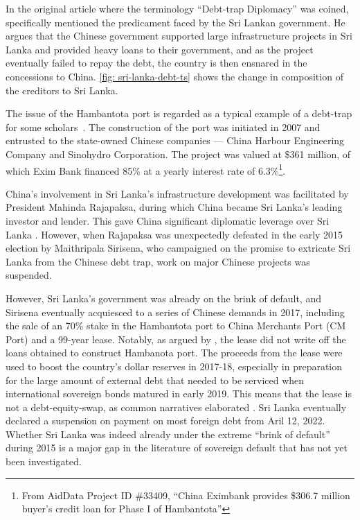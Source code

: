In the original article where the terminology ``Debt-trap Diplomacy'' was coined, \citet{Chellaney_2017} specifically mentioned the predicament faced by the Sri Lankan government. He argues that the Chinese government supported large infrastructure projects in Sri Lanka and provided heavy loans to their government, and as the project eventually failed to repay the debt, the country is then ensnared in the concessions to China. \autoref{fig: sri-lanka-debt-ts} shows the change in composition of the creditors to Sri Lanka.

The issue of the Hambantota port is regarded as a typical example of a debt-trap for some scholars~\citep*{Moramudali_2020}.
The construction of the port was initiated in 2007 and entrusted to the state-owned Chinese companies --- China Harbour Engineering Company and Sinohydro Corporation. The project was valued at \$361 million, of which Exim Bank financed 85\% at a yearly interest rate of 6.3\%\footnote{From AidData Project ID \#33409, ``China Eximbank provides \$306.7 million buyer's credit loan for Phase I of Hambantota''}.


China's involvement in Sri Lanka's infrastructure development was facilitated by President Mahinda Rajapaksa, during which China became Sri Lanka's leading investor and lender. This gave China significant diplomatic leverage over Sri Lanka \citep*{Chellaney_2017}.
However, when Rajapaksa was unexpectedly defeated in the early 2015 election by Maithripala Sirisena, who campaigned on the promise to extricate Sri Lanka from the Chinese debt trap, work on major Chinese projects was suspended.

However, Sri Lanka's government was already on the brink of default, and Sirisena eventually acquiesced to a series of Chinese demands in 2017\footnotemark{}, including the sale of an 70\% stake in the Hambantota port to China Merchants Port (CM Port) and a 99-year lease.
Notably, as argued by \citet*{Moramudali_2019}, the lease did not write off the loans obtained to construct Hambanota port. The proceeds from the lease were used to boost the country's dollar reserves in 2017-18, especially in preparation for the large amount of external debt that needed to be serviced when international sovereign bonds matured in early 2019. This means that the lease is not a debt-equity-swap, as common narratives elaborated \citep*{Moramudali_2020}.
Sri Lanka eventually declared a suspension on payment on most foreign debt from Aril 12, 2022. Whether Sri Lanka was indeed already under the extreme ``brink of default'' during 2015 is a major gap in the literature of sovereign default that has not yet been investigated.
